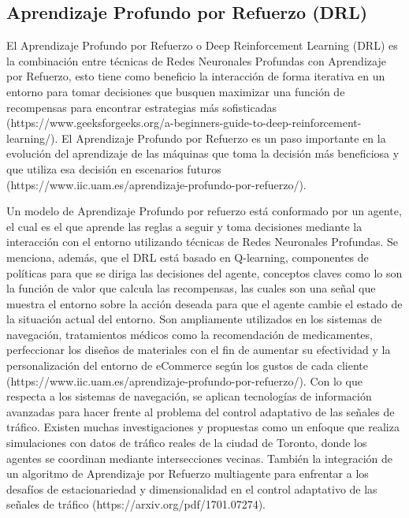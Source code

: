 \subsection{Aprendizaje Profundo por Refuerzo (DRL)}
El Aprendizaje Profundo por Refuerzo o Deep Reinforcement Learning (DRL) es la combinación entre técnicas de Redes Neuronales Profundas con Aprendizaje por Refuerzo, esto tiene como beneficio la interacción de forma iterativa en un entorno para tomar decisiones que busquen maximizar una función de recompensas para encontrar estrategias más sofisticadas (https://www.geeksforgeeks.org/a-beginners-guide-to-deep-reinforcement-learning/). El Aprendizaje Profundo por Refuerzo es un paso importante en la evolución del aprendizaje de las máquinas que toma la decisión más beneficiosa y que utiliza esa decisión en escenarios futuros (https://www.iic.uam.es/aprendizaje-profundo-por-refuerzo/).

 Un modelo de Aprendizaje Profundo por refuerzo está conformado por un agente, el cual es el que aprende las reglas a seguir y toma decisiones mediante la interacción con el entorno utilizando técnicas de Redes Neuronales Profundas.  Se menciona, además, que el DRL está basado en Q-learning, componentes de políticas para que se diriga las decisiones del agente, conceptos claves como lo son la función de valor que calcula las recompensas, las cuales son una señal que muestra el entorno sobre la acción deseada para que el agente cambie el estado de la situación actual del entorno. Son ampliamente utilizados en los sistemas de navegación, tratamientos médicos como la recomendación de medicamentes, perfeccionar los diseños de materiales con el fin de aumentar su efectividad y la personalización del entorno de eCommerce según los gustos de cada cliente (https://www.iic.uam.es/aprendizaje-profundo-por-refuerzo/).
Con lo que respecta a los sistemas de navegación, se aplican tecnologías de información avanzadas para hacer frente al problema del control adaptativo de las señales de tráfico. Existen muchas investigaciones y propuestas como un enfoque que realiza simulaciones con datos de tráfico reales de la ciudad de Toronto, donde los agentes se coordinan mediante intersecciones vecinas. También la integración de un algoritmo de Aprendizaje por Refuerzo multiagente para enfrentar a los desafíos de estacionariedad y dimensionalidad en el control adaptativo de las señales de tráfico (https://arxiv.org/pdf/1701.07274).

